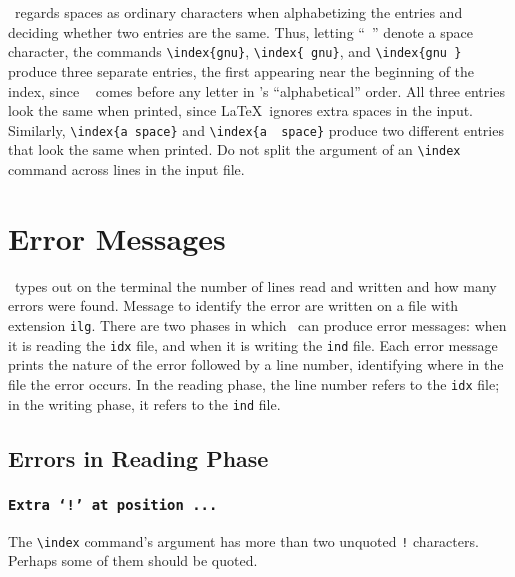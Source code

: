 \MakeIndex\ regards spaces%
as ordinary characters when alphabetizing the
entries and deciding whether two entries are the same.  Thus, letting
``\verb*| |'' denote a space character, the commands
\verb*|\index{gnu}|, \verb*|\index{ gnu}|, and \verb*|\index{gnu }|
produce three separate entries, the first appearing near the beginning
of the index, since \verb*| | comes before any letter in \MakeIndex's
``alphabetical'' order.  All three entries look the same when
printed, since \LaTeX\ ignores extra spaces in the input.  Similarly,
 \verb*|\index{a space}| and \verb*|\index{a  space}| produce two
different entries that look the same when printed.  Do not
split the argument of an \verb|\index| command across lines in the
input file.%



\section{Error Messages} \label{sec:errors}

\MakeIndex\ types out on the terminal the number of lines read and
written and how many errors were found.  Message to identify the error
are written on a file with extension
{\tt ilg}.%
There are two phases
in which \MakeIndex\ can produce error messages: when it is reading the
{\tt idx}%
file, and when it is writing the
{\tt ind}%
file.  Each error
message prints the nature of the error followed by a line number,
identifying where in the file the error occurs.  In the reading phase,
the line number refers to the {\tt idx} file; in the writing phase, it
refers to the {\tt ind} file.

\subsection{Errors in Reading Phase}

\subsubsection*{\tt Extra `!' at position ...}

The \verb|\index| command's argument has more than two unquoted
\verb|!| characters.  Perhaps some of them should be quoted.

